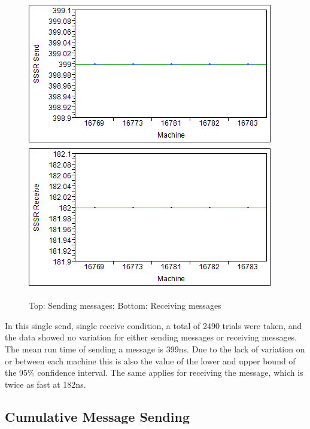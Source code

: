 \documentclass[12pt]{report}
\begin{document}
\begin{figure}[h!]
  \centering
    \includegraphics{SSSRSend.png}
    \includegraphics{SSSRReceive.png}
  \caption{Top: Sending messages; Bottom: Receiving messages}
\end{figure}

In this single send, single receive condition, a total of 2490 trials were taken, and the data showed no variation for either sending messages or receiving messages. The mean run time of sending a message is 399ns. Due to the lack of variation on or between each machine this is also the value of the lower and upper bound of the 95\% confidence interval. The same applies for receiving the message, which is twice as fast at 182ns.

\subsection{Cumulative Message Sending}
\label{sec:cumulative_message_sending}
\end{document}
